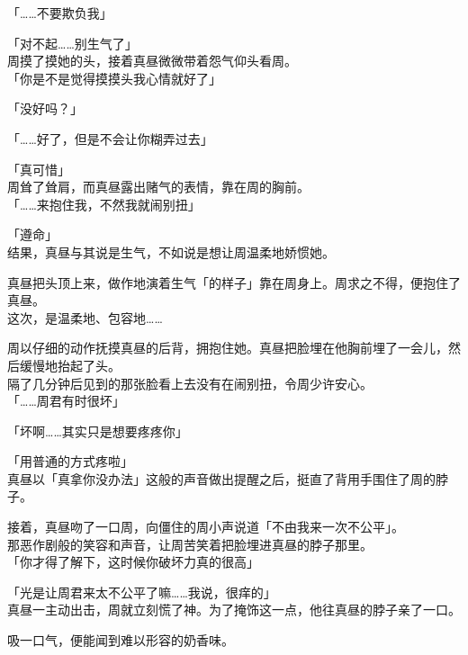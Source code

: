 「……不要欺负我」

「对不起……别生气了」\\

周摸了摸她的头，接着真昼微微带着怨气仰头看周。\\

「你是不是觉得摸摸头我心情就好了」

「没好吗？」

「……好了，但是不会让你糊弄过去」

「真可惜」\\

周耸了耸肩，而真昼露出赌气的表情，靠在周的胸前。\\

「……来抱住我，不然我就闹别扭」

「遵命」\\

结果，真昼与其说是生气，不如说是想让周温柔地娇惯她。

真昼把头顶上来，做作地演着生气「的样子」靠在周身上。周求之不得，便抱住了真昼。\\

这次，是温柔地、包容地……

周以仔细的动作抚摸真昼的后背，拥抱住她。真昼把脸埋在他胸前埋了一会儿，然后缓慢地抬起了头。\\

隔了几分钟后见到的那张脸看上去没有在闹别扭，令周少许安心。\\

「……周君有时很坏」

「坏啊……其实只是想要疼疼你」

「用普通的方式疼啦」\\

真昼以「真拿你没办法」这般的声音做出提醒之后，挺直了背用手围住了周的脖子。

接着，真昼吻了一口周，向僵住的周小声说道「不由我来一次不公平」。\\

那恶作剧般的笑容和声音，让周苦笑着把脸埋进真昼的脖子那里。\\

「你才得了解下，这时候你破坏力真的很高」

「光是让周君来太不公平了嘛……我说，很痒的」\\

真昼一主动出击，周就立刻慌了神。为了掩饰这一点，他往真昼的脖子亲了一口。

吸一口气，便能闻到难以形容的奶香味。\\

